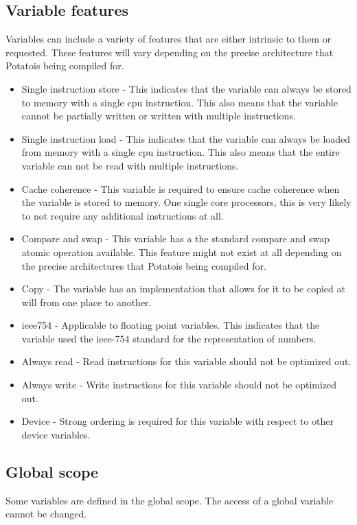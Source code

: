 \documentclass[12pt]{article}
\newcommand{\progLangNameSpace}{Potato\space }
\begin{document}
\subsection{Variable features}

Variables can include a variety of features that are either intrinsic to them or requested. These features will vary depending on the precise architecture that \progLangNameSpace is being compiled for.

\begin{itemize}
\item Single instruction store - This indicates that the variable can always be stored to memory with a single cpu instruction. This also means that the variable cannot be partially written or written with multiple instructions.
\item Single instruction load - This indicates that the variable can always be loaded from memory with a single cpu instruction. This also means that the entire variable can not be read with multiple instructions.
\item Cache coherence - This variable is required to ensure cache coherence when the variable is stored to memory. One single core processors, this is very likely to not require any additional instructions at all.
\item Compare and swap - This variable has a the standard compare and swap atomic operation available. This feature might not exist at all depending on the precise architectures that \progLangNameSpace is being compiled for.
\item Copy - The variable has an implementation that allows for it to be copied at will from one place to another.
\item ieee754 - Applicable to floating point variables. This indicates that the variable used the ieee-754 standard for the representation of numbers.
\item Always read - Read instructions for this variable should not be optimized out.
\item Always write - Write instructions for this variable should not be optimized out.
\item Device - Strong ordering is required for this variable with respect to other device variables.
\end{itemize}

\subsection {Global scope}
Some variables are defined in the global scope. The access of a global variable cannot be changed.
\end{document}
